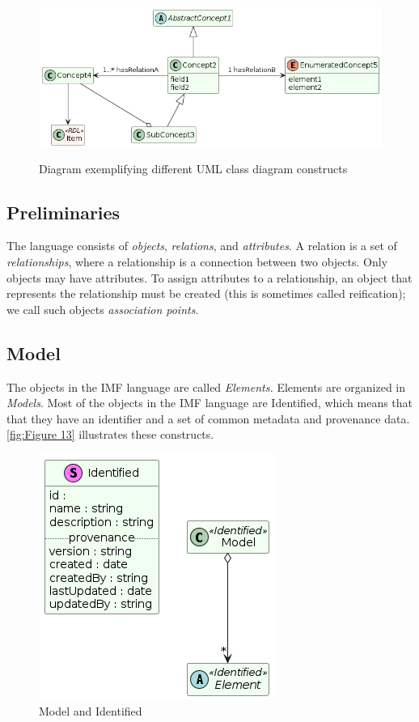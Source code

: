 \begin{figure}[htb]
  \centering
  \includegraphics[width=5in,height=2.0625in]{img/IMFmanual-img031.png}
  \caption{Diagram exemplifying different UML class diagram constructs}
  \label{fig:Figure 12}
\end{figure}

\subsection{Preliminaries}
The language consists of \emph{objects}, \emph{relations}, and \emph{attributes}. A relation is a set of \emph{relationships}, where a relationship is a connection between two objects.  Only objects
may have attributes. To assign attributes to a relationship, an object that represents the relationship must be
created (this is sometimes called reification); we call such objects \emph{association points}.

\subsection{Model}
The objects in the IMF language are called \emph{Elements. }Elements are organized in
\emph{Models}. Most of the objects in the IMF language are Identified, which means that that they have an identifier and a set of common metadata and provenance data. \autoref{fig:Figure 13} illustrates
these constructs.

\begin{figure}[htb]
  \centering
  \includegraphics[width=3.02083in,height=3.15625in]{img/IMFmanual-img032.png}
  \caption{Model and Identified}
  \label{fig:Figure 13}
\end{figure}

